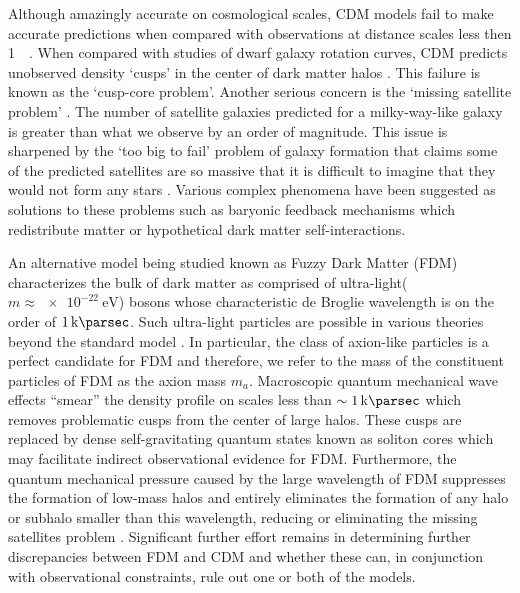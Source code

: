 \documentclass[usenatbib]{mnras}
\newcommand{\squote}[1]{\lq #1\rq}
\newcommand{\poweV}[1]{\SI{e#1}{\electronvolt}}
\begin{document}
\par

Although amazingly accurate on cosmological scales, CDM models fail to make accurate predictions when compared with observations at distance scales less then \SI{1}{\kilo\parsec}. When compared with studies of dwarf galaxy rotation curves, CDM predicts unobserved density \squote{cusps} in the center of dark matter halos \citep{ultralight}. This failure is known as the \squote{cusp-core problem}. Another serious concern is the \squote{missing satellite problem}  \citep{missing_satellites}. The number of satellite galaxies predicted for a milky-way-like galaxy is greater than what we observe by an order of magnitude. This issue is sharpened by the \squote{too big to fail} problem of galaxy formation that claims some of the predicted satellites are so massive that it is difficult to imagine that they would not form any stars \citep{too_big_to_fail}. Various complex phenomena have been suggested as solutions to these problems such as baryonic feedback mechanisms which redistribute matter or  hypothetical dark matter self-interactions.

\par

An alternative model being studied known as Fuzzy Dark Matter (FDM) characterizes the bulk of dark matter as comprised of ultra-light($m \approx \poweV{-22}$) bosons whose characteristic de Broglie wavelength is on the order of $\SI{1}{\kilo\parsec}$. Such ultra-light particles are possible in various theories beyond the standard model \citep{axion_cosmology}. In particular, the class of axion-like particles is a perfect candidate for FDM and therefore, we refer to the mass of the constituent particles of FDM as the axion mass $m_a$. Macroscopic quantum mechanical wave effects “smear” the density profile on scales less than $\sim \SI{1}{\kilo\parsec}$ which removes problematic cusps from the center of large halos. These cusps are replaced by dense self-gravitating quantum states known as soliton cores which may facilitate indirect observational evidence for FDM. Furthermore, the quantum mechanical pressure caused by the large wavelength of FDM suppresses the formation of low-mass halos and entirely eliminates the formation of any halo or subhalo smaller than this wavelength, reducing or eliminating the missing satellites problem \citep{substructure_FDM}. Significant further effort remains in determining further discrepancies between FDM and CDM and whether these can, in conjunction with observational constraints, rule out one or both of the models.
 
\end{document}
